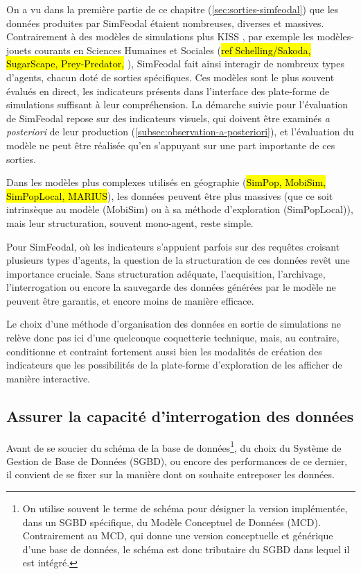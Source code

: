 On a vu dans la première partie de ce chapitre (\cref{sec:sorties-simfeodal}) que les données produites par SimFeodal étaient nombreuses, diverses et massives.
Contrairement à des modèles de simulations plus \og KISS \fg{}, par exemple les \og modèles-jouets\fg{} courants en Sciences Humaines et Sociales (\hl{ref Schelling/Sakoda, SugarScape, Prey-Predator, }), SimFeodal fait ainsi interagir de nombreux types d'agents, chacun doté de sorties spécifiques. Ces modèles sont le plus souvent évalués \og en direct\fg{}, les indicateurs présents dans l'interface des plate-forme de simulations suffisant à leur compréhension.
La démarche suivie pour l'évaluation de SimFeodal repose sur des indicateurs visuels, qui doivent être examinés \textit{a posteriori} de leur production (\cref{subsec:observation-a-posteriori}), et l'évaluation du modèle ne peut être réalisée qu'en s'appuyant sur une part importante de ces sorties.

Dans les modèles plus complexes utilisés en géographie (\hl{SimPop, MobiSim, SimPopLocal, MARIUS}), les données peuvent être plus massives (que ce soit intrinsèque au modèle (MobiSim) ou à sa méthode d'exploration (SimPopLocal)), mais leur structuration, souvent mono-agent, reste simple.

Pour SimFeodal, où les indicateurs s'appuient parfois sur des requêtes croisant plusieurs types d'agents, la question de la structuration de ces données revêt une importance cruciale.
Sans structuration adéquate, l'acquisition, l'archivage, l'interrogation ou encore la sauvegarde des données générées par le modèle ne peuvent être garantis, et encore moins de manière efficace.

Le choix d'une méthode d'organisation des données en sortie de simulations ne relève donc pas ici d'une quelconque coquetterie technique, mais, au contraire, conditionne et contraint fortement aussi bien les modalités de création des indicateurs que les possibilités de la plate-forme d'exploration de les afficher de manière interactive.

	\subsection{Assurer la capacité d'interrogation des données}

	Avant de se soucier du \og schéma\fg{} de la base de données\footnote{
		On utilise souvent le terme de \og schéma\fg{} pour désigner la version implémentée, dans un SGBD spécifique, du Modèle Conceptuel de Données (MCD). Contrairement au MCD, qui donne une version conceptuelle et générique d'une base de données, le schéma est donc tributaire du SGBD dans lequel il est intégré.
	}, du choix du Système de Gestion de Base de Données (SGBD), ou encore des performances de ce dernier, il convient de se fixer sur la manière dont on souhaite entreposer les données.

